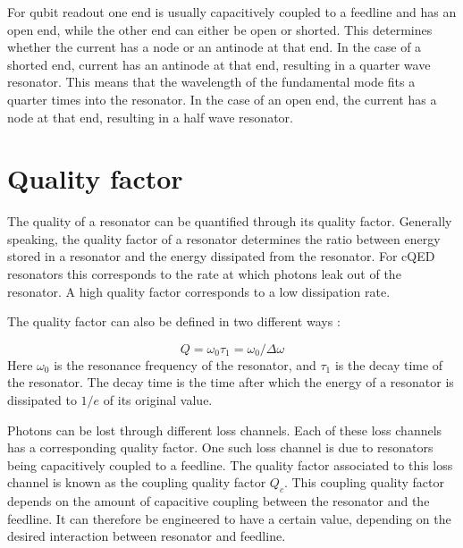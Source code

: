     For qubit readout one end is usually capacitively coupled to a feedline and has an open end, while the other end can either be open or shorted. This determines whether the current has a node or an antinode at that end. In the case of a shorted end, current has an antinode at that end, resulting in a quarter wave resonator. This means that the wavelength of the fundamental mode fits a quarter times into the resonator. In the case of an open end, the current has a node at that end, resulting in a half wave resonator.


  \section{Quality factor}
    \label{sec:Quality factor}
    The quality of a resonator can be quantified through its quality factor. Generally speaking, the quality factor of a resonator determines the ratio between energy stored in a resonator and the energy dissipated from the resonator. For cQED resonators this corresponds to the rate at which photons leak out of the resonator. A high quality factor corresponds to a low dissipation rate.

    The quality factor can also be defined in two different ways \cite[pp.23-24]{Mazin}:

    \begin{equation}
        Q = \omega_0 \tau_1 = \omega_0 / \Delta \omega
        \label{eqn:quality factor definition}
    \end{equation}
    Here $\omega_0$ is the resonance frequency of the resonator, and $\tau_1$ is the decay time of the resonator. The decay time is the time after which the energy of a resonator is dissipated to $1/e$ of its original value.

    Photons can be lost through different loss channels. Each of these loss channels has a corresponding quality factor. One such loss channel is due to resonators being capacitively coupled to a feedline. The quality factor associated to this loss channel is known as the coupling quality factor $Q_c$. This coupling quality factor depends on the amount of capacitive coupling between the resonator and the feedline. It can therefore be engineered to have a certain value, depending on the desired interaction between resonator and feedline.

